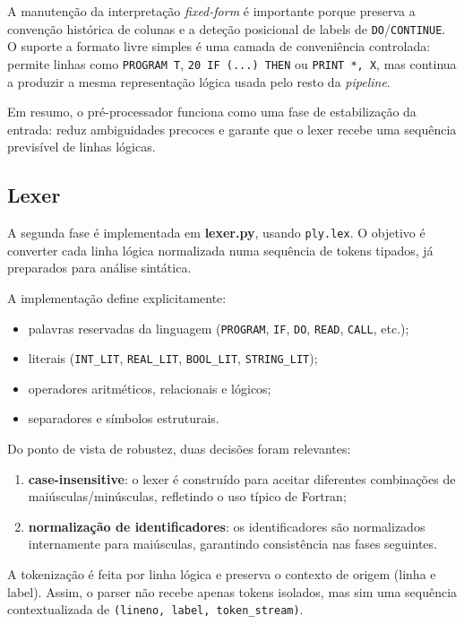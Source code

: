 \documentclass{article}
\begin{document}
A manutenção da interpretação \textit{fixed-form} é importante porque preserva a convenção
histórica de colunas e a deteção posicional de labels de \texttt{DO}/\texttt{CONTINUE}.
O suporte a formato livre simples é uma camada de conveniência controlada: permite linhas
como \texttt{PROGRAM T}, \texttt{20 IF (...) THEN} ou \texttt{PRINT *, X}, mas continua a
produzir a mesma representação lógica usada pelo resto da \textit{pipeline}.

Em resumo, o pré-processador funciona como uma fase de estabilização da entrada: reduz ambiguidades precoces e garante que o lexer recebe uma sequência previsível de linhas lógicas.

\subsection{Lexer}

A segunda fase é implementada em \textbf{lexer.py}, usando \texttt{ply.lex}. O objetivo é converter cada linha lógica normalizada numa sequência de tokens tipados, já preparados para análise sintática.

A implementação define explicitamente:
\begin{itemize}
\item palavras reservadas da linguagem (\texttt{PROGRAM}, \texttt{IF}, \texttt{DO}, \texttt{READ}, \texttt{CALL}, etc.);
\item literais (\texttt{INT\_LIT}, \texttt{REAL\_LIT}, \texttt{BOOL\_LIT}, \texttt{STRING\_LIT});
\item operadores aritméticos, relacionais e lógicos;
\item separadores e símbolos estruturais.
\end{itemize}

Do ponto de vista de robustez, duas decisões foram relevantes:
\begin{enumerate}
\item \textbf{case-insensitive}: o lexer é construído para aceitar diferentes combinações de maiúsculas/minúsculas, refletindo o uso típico de Fortran;
\item \textbf{normalização de identificadores}: os identificadores são normalizados internamente para maiúsculas, garantindo consistência nas fases seguintes.
\end{enumerate}

A tokenização é feita por linha lógica e preserva o contexto de origem (linha e label). Assim, o parser não recebe apenas tokens isolados, mas sim uma sequência contextualizada de \texttt{(lineno, label, token\_stream)}.
\end{document}
